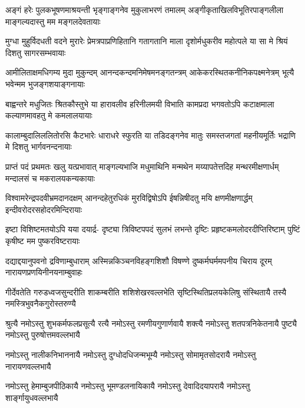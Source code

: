
\fourlineindentedshloka
{अङ्गं हरेः पुलकभूषणमाश्रयन्ती}
{भृङ्गाङ्गनेव मुकुलाभरणं तमालम्}
{अङ्गीकृताखिलविभूतिरपाङ्गलीला}
{माङ्गल्यदास्तु मम मङ्गलदेवतायाः}

\fourlineindentedshloka
{मुग्धा मुहुर्विदधती वदने मुरारेः}
{प्रेमत्रपाप्रणिहितानि गतागतानि}
{माला दृशोर्मधुकरीव महोत्पले या}
{सा मे श्रियं दिशतु सागरसम्भवायाः}

\fourlineindentedshloka
{आमीलिताक्षमधिगम्य मुदा मुकुन्दम्}
{आनन्दकन्दमनिमेषमनङ्गतन्त्रम्}
{आकेकरस्थितकनीनिकपक्ष्मनेत्रम्}
{भूत्यै भवेन्मम भुजङ्गशयाङ्गनायाः}

\fourlineindentedshloka
{बाह्वन्तरे मधुजितः श्रितकौस्तुभे या}
{हारावलीव हरिनीलमयी विभाति}
{कामप्रदा भगवतोऽपि कटाक्षमाला}
{कल्याणमावहतु मे कमलालयायाः}

\fourlineindentedshloka
{कालाम्बुदालिललितोरसि कैटभारेः}
{धाराधरे स्फुरति या तडिदङ्गनेव}
{मातुः समस्तजगतां महनीयमूर्तिः}
{भद्राणि मे दिशतु भार्गवनन्दनायाः}

\fourlineindentedshloka
{प्राप्तं पदं प्रथमतः खलु यत्प्रभावात्}
{माङ्गल्यभाजि मधुमाथिनि मन्मथेन}
{मय्यापतेत्तदिह मन्थरमीक्षणार्धम्}
{मन्दालसं च मकरालयकन्यकायाः}

\fourlineindentedshloka
{विश्वामरेन्द्रपदवीभ्रमदानदक्षम्}
{आनन्दहेतुरधिकं मुरविद्विषोऽपि}
{ईषन्निषीदतु मयि क्षणमीक्षणार्द्धम्}
{इन्दीवरोदरसहोदरमिन्दिरायाः}

\fourlineindentedshloka
{इष्टा विशिष्टमतयोऽपि यया दयार्द्र-}
{दृष्ट्या त्रिविष्टपपदं सुलभं लभन्ते}
{दृष्टिः प्रहृष्टकमलोदरदीप्तिरिष्टाम्}
{पुष्टिं कृषीष्ट मम पुष्करविष्टरायाः}

\fourlineindentedshloka
{दद्याद्दयानुपवनो द्रविणाम्बुधाराम्}
{अस्मिन्नकिञ्चनविहङ्गशिशौ विषण्णे}
{दुष्कर्मघर्ममपनीय चिराय दूरम्}
{नारायणप्रणयिनीनयनाम्बुवाहः}

\fourlineindentedshloka
{गीर्देवतेति गरुडध्वजसुन्दरीति}
{शाकम्बरीति शशिशेखरवल्लभेति}
{सृष्टिस्थितिप्रलयकेलिषु संस्थितायै}
{तस्यै नमस्त्रिभुवनैकगुरोस्तरुण्यै}

\fourlineindentedshloka
{श्रुत्यै नमोऽस्तु शुभकर्मफलप्रसूत्यै}
{रत्यै नमोऽस्तु रमणीयगुणार्णवायै}
{शक्त्यै नमोऽस्तु शतपत्रनिकेतनायै}
{पुष्ट्यै नमोऽस्तु पुरुषोत्तमवल्लभायै}

\fourlineindentedshloka
{नमोऽस्तु नालीकनिभाननायै}
{नमोऽस्तु दुग्धोदधिजन्मभूम्यै}
{नमोऽस्तु सोमामृतसोदरायै}
{नमोऽस्तु नारायणवल्लभायै}

\fourlineindentedshloka
{नमोऽस्तु हेमाम्बुजपीठिकायै}
{नमोऽस्तु भूमण्डलनायिकायै}
{नमोऽस्तु देवादिदयापरायै}
{नमोऽस्तु शार्ङ्गायुधवल्लभायै}

